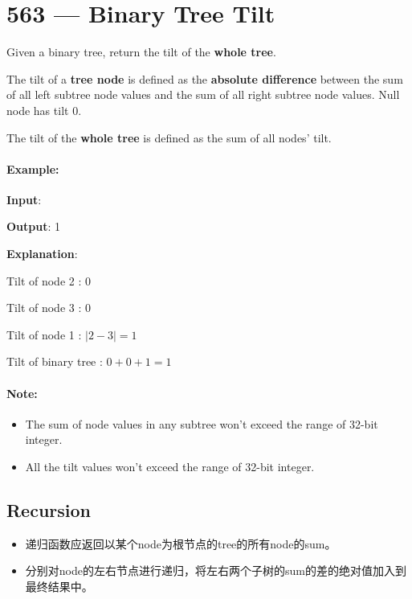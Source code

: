 \section{563 --- Binary Tree Tilt}
Given a binary tree, return the tilt of the \textbf{whole tree}.

The tilt of a \textbf{tree node} is defined as the \textbf{absolute difference} between the sum of all left subtree node values and the sum of all right subtree node values. Null node has tilt 0.

The tilt of the \textbf{whole tree} is defined as the sum of all nodes' tilt.

\paragraph{Example:}
\begin{flushleft}
\textbf{Input}: 
\begin{figure}[H]
\end{figure}

\textbf{Output}: 1

\textbf{Explanation}: 

Tilt of node 2 : 0

Tilt of node 3 : 0

Tilt of node 1 : $\lvert 2-3\rvert = 1$

Tilt of binary tree : $0 + 0 + 1 = 1$
\end{flushleft}

\paragraph{Note:}

\begin{itemize}
\item The sum of node values in any subtree won't exceed the range of 32-bit integer.
\item All the tilt values won't exceed the range of 32-bit integer.
\end{itemize}

\subsection{Recursion}
\begin{itemize}
\item 递归函数应返回以某个node为根节点的tree的所有node的sum。
\item 分别对node的左右节点进行递归，将左右两个子树的sum的差的绝对值加入到最终结果中。
\end{itemize}

